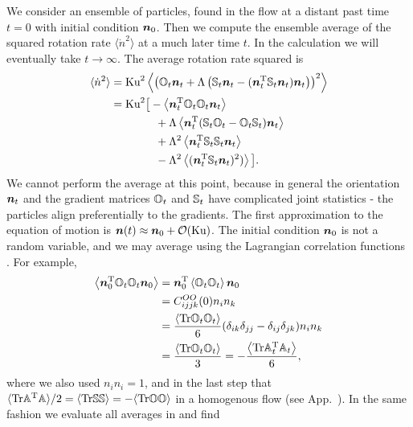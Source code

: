 \documentclass[thesis.tex]{subfiles}
\begin{document}
We consider an ensemble of particles, found in the flow at a distant past time $t=0$ with initial condition $\mbox{\boldmath$n$}_0$. Then we compute the ensemble average of the squared rotation rate $\langle \dot n^2\rangle$ at a much later time $t$.
In the calculation we will eventually take $t\to\infty$. The average rotation rate squared is
\begin{align}
	\langle \dot n^2\rangle &= \ku^2\left\langle\left(\ma O_{t}\ve n_{t}+\Lambda\left(\ma S_{t}\ve n_{t}-(\ve n_{t}\transpose\ma S_{t}\ve n_{t})\ve n_{t}\right)\right)^2\right\rangle\nn \nn\\
	&= \ku^2\big[-\left\langle\ve n_{t}\transpose \ma O_{t} \ma O_{t} \ve n_{t}\right\rangle \nn\\
	&\qquad\qquad+ \Lambda\left\langle\ve n_{t}\transpose(\ma S_{t}\ma O_{t} - \ma O_{t}\ma S_{t})\ve n_t\right\rangle \nn\\
	&\qquad\qquad+ \Lambda^2\left\langle\ve n_{t}\transpose\ma S_{t}\ma S_{t}\ve n_{t}\right\rangle \nn\\
	&\qquad\qquad-  \Lambda^2\left\langle(\ve n_{t}\transpose\ma S_{t}\ve n_{t})^2)\right\rangle\big].\eqnlab{ndotsquared}
\end{align}
We cannot perform the average at this point, because in general the orientation $\mbox{\boldmath$n$}_t$ and the gradient matrices $\mathbb{O}_t$ and $\mathbb{S}_t$ have complicated joint statistics - the particles align preferentially to the gradients. 
The first approximation to the equation of motion  is $\mbox{\boldmath$n$}(t) \approx \mbox{\boldmath$n$}_0 + \mathcal O(\mbox{Ku})$.
The initial condition $\mbox{\boldmath$n$}_0$ is not a random variable, and we may average using the Lagrangian correlation functions . For example,
\begin{align*}
 	\left\langle\mbox{\boldmath$n$}_{0}^{\mathrm T} \mathbb{O}_{t} \mathbb{O}_{t} \mbox{\boldmath$n$}_{0}\right\rangle&=\mbox{\boldmath$n$}_{0}^{\mathrm T}\left\langle \mathbb{O}_{t} \mathbb{O}_{t} \right\rangle\mbox{\boldmath$n$}_{0} \\
 	&= C^{OO}_{ijjk}(0)n_in_k\\
 	&= \frac{\left\langle \mbox{Tr} \mathbb{O}_t\mathbb{O}_t\right\rangle}{6}( \delta_{ik}\delta_{jj}-\delta_{ij}\delta_{jk})n_in_k\\
 	&=\frac{\left\langle \mbox{Tr} \mathbb{O}_t\mathbb{O}_t\right\rangle}{3} = -\frac{\left\langle \mbox{Tr} \mathbb{A}_t^{\mathrm T}\mathbb{A}_t\right\rangle}{6},
 \end{align*}
where we also used $n_in_i=1$, and in the last step that $\langle\mbox{Tr}\mathbb{A}^{\mathrm T} \mathbb{A}\rangle/2=\langle\mbox{Tr}\mathbb{S}\mathbb{S}\rangle=-\langle\mbox{Tr}\mathbb{O}\mathbb{O}\rangle$ in a homogenous flow (see App.~). In the same fashion we evaluate all averages in  and find
\end{document}
